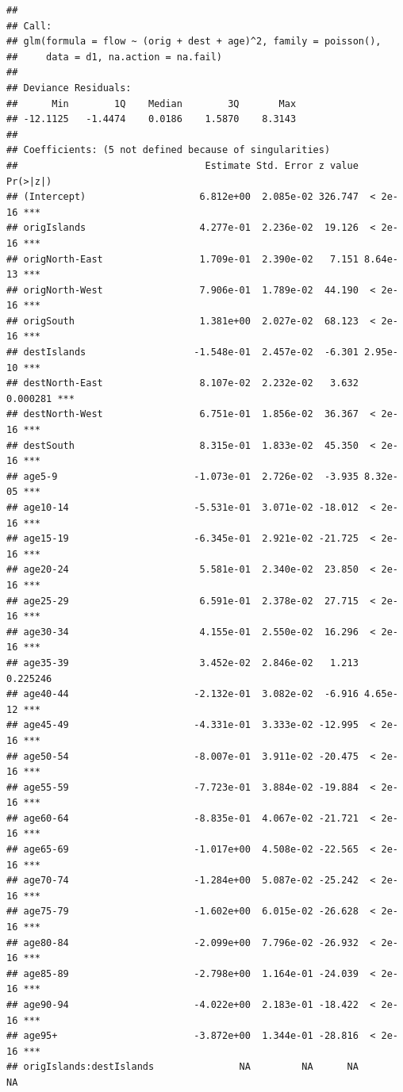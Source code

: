 \documentclass[
]{book}
\begin{document}
\begin{verbatim}
## 
## Call:
## glm(formula = flow ~ (orig + dest + age)^2, family = poisson(), 
##     data = d1, na.action = na.fail)
## 
## Deviance Residuals: 
##      Min        1Q    Median        3Q       Max  
## -12.1125   -1.4474    0.0186    1.5870    8.3143  
## 
## Coefficients: (5 not defined because of singularities)
##                                 Estimate Std. Error z value Pr(>|z|)    
## (Intercept)                    6.812e+00  2.085e-02 326.747  < 2e-16 ***
## origIslands                    4.277e-01  2.236e-02  19.126  < 2e-16 ***
## origNorth-East                 1.709e-01  2.390e-02   7.151 8.64e-13 ***
## origNorth-West                 7.906e-01  1.789e-02  44.190  < 2e-16 ***
## origSouth                      1.381e+00  2.027e-02  68.123  < 2e-16 ***
## destIslands                   -1.548e-01  2.457e-02  -6.301 2.95e-10 ***
## destNorth-East                 8.107e-02  2.232e-02   3.632 0.000281 ***
## destNorth-West                 6.751e-01  1.856e-02  36.367  < 2e-16 ***
## destSouth                      8.315e-01  1.833e-02  45.350  < 2e-16 ***
## age5-9                        -1.073e-01  2.726e-02  -3.935 8.32e-05 ***
## age10-14                      -5.531e-01  3.071e-02 -18.012  < 2e-16 ***
## age15-19                      -6.345e-01  2.921e-02 -21.725  < 2e-16 ***
## age20-24                       5.581e-01  2.340e-02  23.850  < 2e-16 ***
## age25-29                       6.591e-01  2.378e-02  27.715  < 2e-16 ***
## age30-34                       4.155e-01  2.550e-02  16.296  < 2e-16 ***
## age35-39                       3.452e-02  2.846e-02   1.213 0.225246    
## age40-44                      -2.132e-01  3.082e-02  -6.916 4.65e-12 ***
## age45-49                      -4.331e-01  3.333e-02 -12.995  < 2e-16 ***
## age50-54                      -8.007e-01  3.911e-02 -20.475  < 2e-16 ***
## age55-59                      -7.723e-01  3.884e-02 -19.884  < 2e-16 ***
## age60-64                      -8.835e-01  4.067e-02 -21.721  < 2e-16 ***
## age65-69                      -1.017e+00  4.508e-02 -22.565  < 2e-16 ***
## age70-74                      -1.284e+00  5.087e-02 -25.242  < 2e-16 ***
## age75-79                      -1.602e+00  6.015e-02 -26.628  < 2e-16 ***
## age80-84                      -2.099e+00  7.796e-02 -26.932  < 2e-16 ***
## age85-89                      -2.798e+00  1.164e-01 -24.039  < 2e-16 ***
## age90-94                      -4.022e+00  2.183e-01 -18.422  < 2e-16 ***
## age95+                        -3.872e+00  1.344e-01 -28.816  < 2e-16 ***
## origIslands:destIslands               NA         NA      NA       NA    

\end{verbatim}
\end{document}
